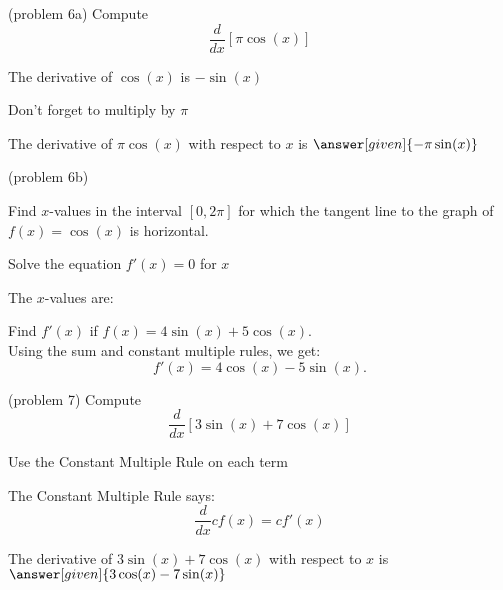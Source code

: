 \documentclass{ximera}
\begin{document}
\begin{problem}(problem 6a)
  Compute 
  \[
  \frac{d}{dx} \left[\pi\cos(x)\right]
  \]
  
    \begin{hint}
      The derivative of $\cos(x)$ is $-\sin(x)$
    \end{hint}
		\begin{hint}
		  Don't forget to multiply by $\pi$
		\end{hint}
		
		The derivative of $\pi\cos(x)$ with respect to $x$ is
		 $\answer[given]{-\pi\sin(x)}$
	
\end{problem}



\begin{problem}(problem 6b)

Find $x$-values in the interval $[0, 2\pi]$ for which the tangent line to the graph of $f(x) = \cos(x)$ is horizontal.


\begin{hint}
Solve the equation $f'(x) = 0$ for $x$
\end{hint}

The $x$-values are:
\begin{multipleChoice}
  \choice{$-\pi,0 \pi$}
\end{multipleChoice}

\end{problem}



\begin{center}
\begin{foldable}
\end{foldable}
\end{center}


\begin{example}[example 7]
 Find $f'(x)$ if $f(x) = 4\sin(x) + 5\cos(x).$ \\
 Using the sum and constant multiple rules, we get: 
\[
f'(x) = 4\cos(x) - 5\sin(x).
\]
\end{example}


\begin{problem}(problem 7)
  Compute 
  \[
  \frac{d}{dx} \left[3\sin(x) + 7\cos(x)\right]
  \]
  
		\begin{hint}
      Use the Constant Multiple Rule on each term
    \end{hint}
    \begin{hint}
      The Constant Multiple Rule says:
      \[
      \frac{d}{dx} cf(x) = cf'(x)
      \]
    \end{hint}    
		The derivative of $3\sin(x) + 7\cos(x)$ with respect to $x$ is
		 $\answer[given]{3\cos(x) - 7\sin(x)}$
	
\end{problem}
\end{document}
